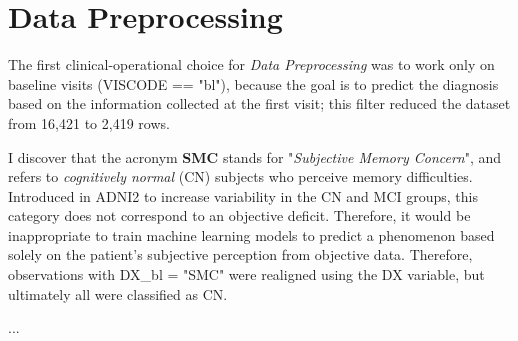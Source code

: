 \section{Data Preprocessing}
The first clinical-operational choice for \textit{Data Preprocessing} was to work only on baseline visits (VISCODE == "bl"), because the goal is to predict the diagnosis based on the information collected at the first visit; this filter reduced the dataset from 16,421 to 2,419 rows. 

I discover that the acronym \textbf{SMC} stands for "\textit{Subjective Memory Concern}", and refers to \textit{cognitively normal} (CN) subjects who perceive memory difficulties. Introduced in ADNI2 to increase variability in the CN and MCI groups, this category does not correspond to an objective deficit. Therefore, it would be inappropriate to train machine learning models to predict a phenomenon based solely on the patient's subjective perception from objective data. Therefore, observations with \linebreak DX\_bl = "SMC" were realigned using the DX variable, but ultimately all were classified as CN.


...



